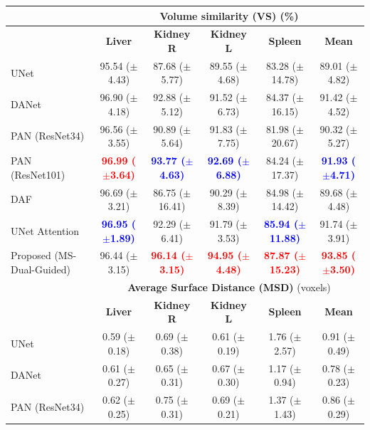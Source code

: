 \documentclass[journal]{IEEEtran}
\begin{document}
\begin{table}[t!]
\begin{tabular}{lcccc|c}
\midrule
& \multicolumn{5}{c}{\textbf{Volume similarity (VS)} (\%)}\\
 \midrule
 & \textbf{Liver} & \textbf{Kidney R} & \textbf{Kidney L} & \textbf{Spleen} & \textbf{Mean}  \\
 \midrule
UNet \cite{ronneberger2015u}  &  95.54 ($\pm$4.43)& 87.68 ($\pm$5.77)& 89.55 ($\pm$4.68)& 83.28 ($\pm$14.78)& 89.01 ($\pm$4.82)\\
DANet \cite{fu2018dual}  &  96.90 ($\pm$4.18) & 92.88 ($\pm$5.12)& 91.52 ($\pm$6.73) & 84.37 ($\pm$16.15)& 91.42  ($\pm$4.52)   \\
PAN (ResNet34) \cite{li2018pyramid}   &  96.56 ($\pm$3.55)  & 90.89 ($\pm$5.64) & 91.83 ($\pm$7.75) & 81.98 ($\pm$20.67) & 90.32 ($\pm$5.27) \\
PAN (ResNet101) \cite{li2018pyramid}   & \textcolor{red}{\textbf{96.99 ($\pm$3.64)}}  & \textcolor{blue}{\textbf{93.77 ($\pm$4.63)}} & \textcolor{blue}{\textbf{92.69 ($\pm$6.88)}} & 84.24 ($\pm$17.37) & \textcolor{blue}{\textbf{91.93 ($\pm$4.71)}} \\
DAF \cite{wang18d}  &  96.69 ($\pm$3.21) & 86.75 ($\pm$16.41) & 90.29 ($\pm$8.39) & 84.98 ($\pm$14.42) &   89.68 ($\pm$4.48)  \\
UNet Attention \cite{schlemper2019attention}  &   \textcolor{blue}{\textbf{96.95 ($\pm$1.89)}} & 92.29 ($\pm$6.41)& 91.79 ($\pm$3.53) & \textcolor{blue}{\textbf{85.94 ($\pm$11.88)}} &  91.74 ($\pm$3.91)   \\
Proposed (MS-Dual-Guided)  &  96.44 ($\pm$3.15)  & \textcolor{red}{\textbf{96.14 ($\pm$3.15)}}& \textcolor{red}{\textbf{94.95 ($\pm$4.48)}}  & \textcolor{red}{\textbf{87.87 ($\pm$15.23)}} & \textcolor{red}{\textbf{93.85 ($\pm$3.50)}} \\
\midrule
& \multicolumn{5}{c}{\textbf{Average Surface Distance (MSD)} (voxels)}\\
 \midrule
 & \textbf{Liver} & \textbf{Kidney R} & \textbf{Kidney L} & \textbf{Spleen} & \textbf{Mean}  \\
 \midrule
UNet \cite{ronneberger2015u}  & 0.59 ($\pm$0.18)& 0.69 ($\pm$0.38)& 0.61 ($\pm$0.19)& 1.76 ($\pm$2.57)& 0.91 ($\pm$0.49) \\
DANet \cite{fu2018dual}  &  0.61 ($\pm$0.27) & 0.65 ($\pm$0.31)& 0.67 ($\pm$0.30) & 1.17 ($\pm$0.94)& 0.78  ($\pm$0.23)   \\
PAN (ResNet34)\cite{li2018pyramid}   & 0.62 ($\pm$0.25)  & 0.75 ($\pm$0.31) & 0.69 ($\pm$0.21) & 1.37 ($\pm$1.43) & 0.86 ($\pm$0.29) \\

\end{tabular}
\end{table}
\end{document}
